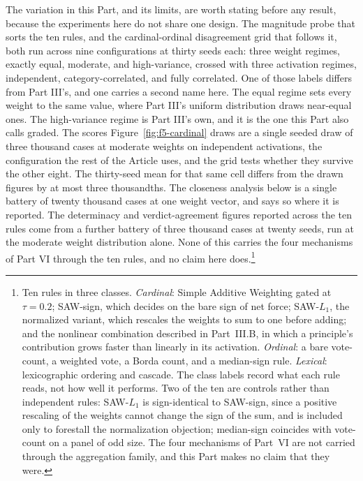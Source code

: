 The variation in this Part, and its limits, are worth stating before any
result, because the experiments here do not share one design. The magnitude
probe that sorts the ten rules, and the cardinal-ordinal disagreement grid
that follows it, both run across nine configurations at thirty seeds each:
three weight regimes, exactly equal, moderate, and high-variance, crossed with
three activation regimes, independent, category-correlated, and fully
correlated. One of those labels differs from Part III's, and one carries a second name
here. The equal regime sets every weight to the same value, where Part III's
uniform distribution draws near-equal ones. The high-variance regime is Part
III's own, and it is the one this Part also calls graded. The scores Figure~\ref{fig:f5-cardinal} draws are a single seeded
draw of three thousand cases at moderate weights on independent activations,
the configuration the rest of the Article uses, and the grid tests whether
they survive the other eight. The thirty-seed mean for that same cell differs
from the drawn figures by at most three thousandths. The closeness analysis
below is
a single battery of twenty thousand cases at one weight vector, and says so
where it is reported. The determinacy and verdict-agreement figures reported
across the ten rules come from a further battery of three thousand cases at
twenty seeds, run at the moderate weight distribution alone. None of this
carries the four mechanisms of Part VI
through the ten rules, and no claim here does.\footnote{Ten rules in three classes. \textit{Cardinal}: Simple
Additive Weighting gated at $\tau = 0.2$; SAW-sign, which decides on the
bare sign of net force; SAW-$L_1$, the normalized variant, which rescales
the weights to sum to one before adding; and the
nonlinear combination described in Part~III.B, in which a principle's
contribution grows faster than linearly in its activation.
\textit{Ordinal}: a bare vote-count, a weighted vote, a Borda count, and
a median-sign rule. \textit{Lexical}: lexicographic ordering and cascade.
The class labels record what each rule reads, not how well it performs.
Two of the ten are controls rather than independent rules: SAW-$L_1$ is
sign-identical to SAW-sign, since a positive rescaling of the weights
cannot change the sign of the sum, and is included only to forestall the
normalization objection; median-sign coincides with vote-count on a panel
of odd size. The four mechanisms of Part~VI are not carried through the
aggregation family, and this Part makes no claim that they were.}

